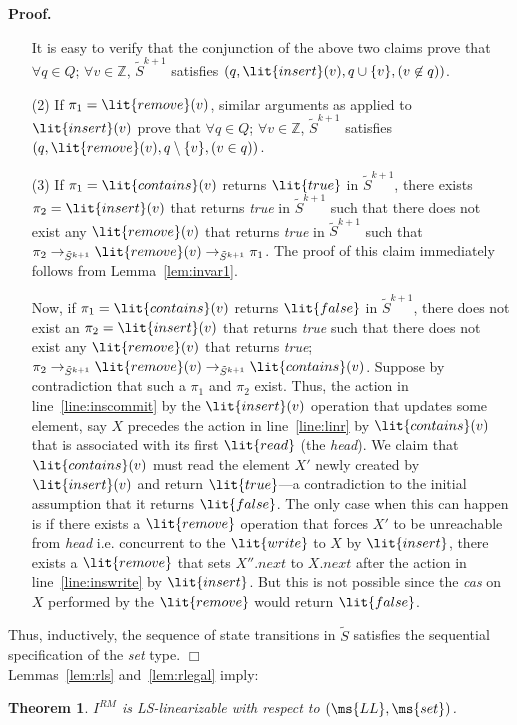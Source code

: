 \documentclass[11pt,pdftex,letterpaper]{article}
\newtheorem{theorem}{Theorem}
\newenvironment{proof}[1][Proof]{\noindent\textbf{#1.} }{\hfill $\Box$\\[2mm]}
\newcommand{\LS}{LS}
\newcommand{\true}{\lit{true}}
\newcommand{\false}{\lit{false}}
\newcommand{\LL}{\ms{LL}}
\begin{document}
\begin{proof}
\begin{enumerate}
It is easy to verify that the conjunction of the above two claims prove that $\forall q\in Q$; $\forall v\in \mathbb{Z}$, ${\tilde S}^{k+1}$ satisfies $(q,\lit{insert}(v),q \cup \{v\},(v \not\in q))$.
\item[(2)]
If $\pi_1=\lit{remove}(v)$, similar arguments as applied to $\lit{insert}(v)$ prove that $\forall q\in Q$; $\forall v\in \mathbb{Z}$, ${\tilde S}^{k+1}$ satisfies $(q,\lit{remove}(v),q \setminus \{v\},(v \in q))$.

\item[(3)]
If $\pi_1=\lit{contains}(v)$ returns $\true$ in ${\tilde S}^{k+1}$, there exists $\pi_2=\lit{insert}(v)$ that returns \emph{true} in ${\tilde S}^{k+1}$ such that there does not exist any $\lit{remove}(v)$ that returns \emph{true} in ${\tilde S}^{k+1}$ such that $\pi_2 \rightarrow_{{\tilde S}^{k+1}} \lit{remove}(v) \rightarrow_{{\tilde S}^{k+1}} \pi_1$.
The proof of this claim immediately follows from Lemma~\ref{lem:invar1}.


Now, if $\pi_1=\lit{contains}(v)$ returns $\false$ in ${\tilde S}^{k+1}$, 
there does not exist an $\pi_2=\lit{insert}(v)$ that returns \emph{true} such that 
there does not exist any $\lit{remove}(v)$ that returns \emph{true}; 
$\pi_2 \rightarrow_{{\tilde S}^{k+1}} \lit{remove}(v) \rightarrow_{{\tilde S}^{k+1}} \lit{contains}(v)$.
Suppose by contradiction that such a $\pi_1$ and $\pi_2$ exist. 
Thus, the action in line~\ref{line:inscommit} by the $\lit{insert}(v)$ operation that updates some element, 
say $X$ precedes the action in line~\ref{line:linr} by $\lit{contains}(v)$ that is associated with its 
first $\lit{read}$ (the \emph{head}).
We claim that $\lit{contains}(v)$ must read the element $X'$ newly created by
$\lit{insert}(v)$ and return $\true$---a contradiction to the initial assumption that it returns $\false$.
The only case when this can happen is if there exists a $\lit{remove}$
operation that forces $X'$ to be unreachable from \emph{head} i.e. concurrent to the $\lit{write}$
to $X$ by $\lit{insert}$, there exists a $\lit{remove}$ that sets $X''.\textit{next}$ to $X.\textit{next}$
after the action in line~\ref{line:inswrite} by $\lit{insert}$.
But this is not possible since the \emph{cas} on $X$ performed by the $\lit{remove}$
would return $\false$.
\end{enumerate}
Thus, inductively, the sequence of state transitions in ${\tilde S}$
satisfies the sequential specification of the \textit{set} type. 
\end{proof}
Lemmas~\ref{lem:rls} and~\ref{lem:rlegal} imply:
\begin{theorem}
\label{th:lr}
$I^{RM}$ is \LS-linearizable with respect to $(\LL,\ms{set})$.
\end{theorem}
\end{document}
